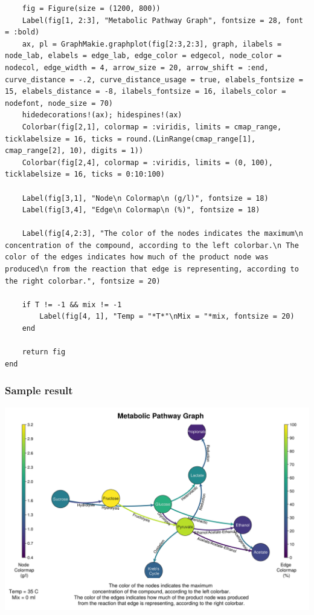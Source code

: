 \documentclass[11pt]{article}
\begin{document}
\begin{verbatim}
    fig = Figure(size = (1200, 800))
    Label(fig[1, 2:3], "Metabolic Pathway Graph", fontsize = 28, font = :bold)
    ax, pl = GraphMakie.graphplot(fig[2:3,2:3], graph, ilabels = node_lab, elabels = edge_lab, edge_color = edgecol, node_color = nodecol, edge_width = 4, arrow_size = 20, arrow_shift = :end, curve_distance = -.2, curve_distance_usage = true, elabels_fontsize = 15, elabels_distance = -8, ilabels_fontsize = 16, ilabels_color = nodefont, node_size = 70)
    hidedecorations!(ax); hidespines!(ax)
    Colorbar(fig[2,1], colormap = :viridis, limits = cmap_range, ticklabelsize = 16, ticks = round.(LinRange(cmap_range[1], cmap_range[2], 10), digits = 1))
    Colorbar(fig[2,4], colormap = :viridis, limits = (0, 100), ticklabelsize = 16, ticks = 0:10:100)

    Label(fig[3,1], "Node\n Colormap\n (g/l)", fontsize = 18)
    Label(fig[3,4], "Edge\n Colormap\n (%)", fontsize = 18)

    Label(fig[4,2:3], "The color of the nodes indicates the maximum\n concentration of the compound, according to the left colorbar.\n The color of the edges indicates how much of the product node was produced\n from the reaction that edge is representing, according to the right colorbar.", fontsize = 20)

    if T != -1 && mix != -1
        Label(fig[4, 1], "Temp = "*T*"\nMix = "*mix, fontsize = 20)
    end

    return fig
end
\end{verbatim}

\subsubsection{Sample result}
\label{sec:orge2590d4}
\begin{center}
\includegraphics[width=.9\linewidth]{../plots/metabolic_results/35_0.png}
\end{center}
\end{document}
